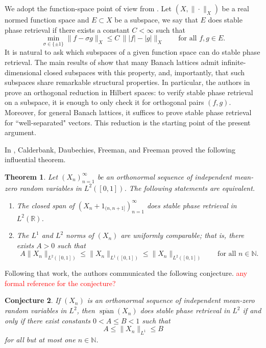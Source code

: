 \documentclass[11pt]{amsart}
\newtheorem{theorem}{Theorem}
\newtheorem{conjecture}[theorem]{Conjecture}
\newcommand{\N}{\mathbb N}
\newcommand{\R}{\mathbb R}
\newcommand{\Span}{\operatorname{span}}
\begin{document}
We adopt the function-space point of view from \cite{FOTP}. Let $(X,\|\cdot\|_X)$ be a real
normed function space and $E \subset X$ be a subspace, we say that $E$ does stable
phase retrieval if there exists a constant $C < \infty$ such that
\[
\min_{\sigma \in \{\pm 1\}} \|f-\sigma g\|_X
\leq C \, \bigl\||f|-|g|\bigr\|_X
\qquad
\text{for all } f,g \in E.
\]
It is natural to ask which subspaces of a given function
space can do stable phase retrieval. The main results of \cite{christ2022examples, FOTP,garcia2025isometric,garcia2025existence} show that
many Banach lattices admit infinite-dimensional closed subspaces
with this property, and, importantly, that such subspaces share remarkable structural properties. In particular, the authors in \cite{FOTP} prove an orthogonal reduction
in Hilbert spaces: to verify stable phase retrieval on a subspace, it is
enough to only check it for orthogonal pairs $(f,g)$. Moreover, for general Banach lattices, it suffices to prove stable phase retrieval for ``well-separated" vectors. This reduction is the starting point of the present
 argument.

In \cite{calderbank2022stable}, Calderbank, Daubechies, Freeman, and Freeman
proved the following influential theorem.

\begin{theorem}\cite[Theorem Number?]{calderbank2022stable}
\label{ThmCDFF}
Let $(X_n)_{n=1}^\infty$ be an orthonormal sequence of independent mean-zero
random variables in $L^2([0,1])$. The following statements are equivalent.
\begin{enumerate}[label=\rm(\arabic*)]
\item The closed span of $(X_n+1_{(n,n+1]})_{n=1}^\infty$ does stable phase
retrieval in $L^2(\R)$.
\item The $L^1$ and $L^2$ norms of $(X_n)$ are uniformly comparable; that is,
there exists $A>0$ such that
\[
A\|X_n\|_{L^2([0,1])}\leq \|X_n\|_{L^1([0,1])}\leq \|X_n\|_{L^2([0,1])}
\qquad
\text{for all } n\in \N.
\]
\end{enumerate}
\end{theorem}

Following that work, the authors communicated the following conjecture. \textcolor{red}{any formal reference for the conjecture?}

\begin{conjecture}\label{conj:cdff}
If $(X_n)$ is an orthonormal sequence of independent mean-zero random
variables in $L^2$, then $\overline{\Span}(X_n)$ does stable phase retrieval in $L^2$ if
and only if there exist constants $0<A\leq B<1$ such that
\[
A\leq \|X_n\|_{L^1}\leq B
\]
for all but at most one $n\in \N$.
\end{conjecture}
\end{document}
